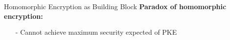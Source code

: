\begin{frame}{Homomorphic Encryption as Building Block}
\textbf{Paradox of homomorphic encryption:}
\begin{itemize}
\item[-] Cannot achieve maximum security expected of PKE
\end{itemize}
\end{frame}